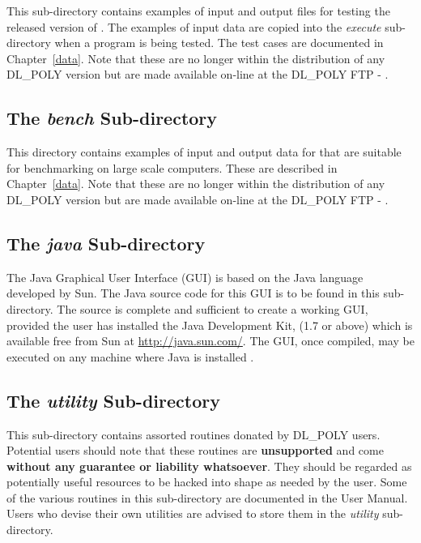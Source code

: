 This sub-directory contains examples of input and output files for
testing the released version of \D.  The examples of input data
are copied into the {\em execute} sub-directory when a program is
being tested.  The test cases are documented in Chapter~\ref{data}.
Note that these are no longer within the distribution of any
DL\_POLY version but are made available on-line at the DL\_POLY FTP
- \FTP{}.

\subsection{The {\em bench} Sub-directory}

This directory contains examples of input and output data for \D
that are suitable for benchmarking \D on large scale computers.
These are described in Chapter~\ref{data}. Note that these are no
longer within the distribution of any DL\_POLY version but
are made available on-line at the DL\_POLY FTP - \FTP{}.

\subsection{The {\em java} Sub-directory}

The \D Java Graphical User Interface (GUI) is based on
the Java language developed by Sun.  The Java source code for this
GUI is to be found in this sub-directory.  The source is complete
and sufficient to create a working GUI, provided the user has installed
the Java Development Kit, (1.7 or above) which is available free
from Sun at \href{http://java.sun.com/}{http://java.sun.com/}.
The GUI, once compiled, may be executed on any machine where Java
is installed \cite{smith-gui}.

\subsection{The {\em utility} Sub-directory}

This sub-directory contains assorted routines donated by DL\_POLY
users.  Potential users should note that these routines are {\bf
unsupported} and come {\bf without any guarantee or liability
whatsoever}.  They should be regarded as potentially useful
resources to be hacked into shape as needed by the user.  Some of
the various routines in this sub-directory are documented in the \C
User Manual.  Users who devise their own utilities are advised
to store them in the {\em utility} sub-directory.

